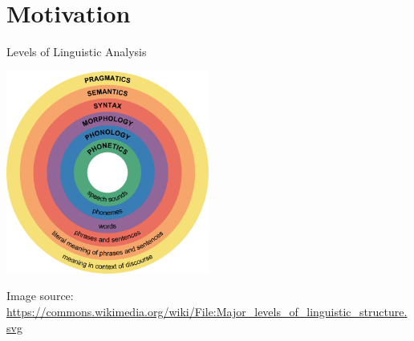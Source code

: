 

%
%


%
%  


\section{Motivation}





\begin{frame}{Levels of Linguistic Analysis}
	\vspace{-15pt}
	
  \begin{center}
  	\includegraphics[width=0.5\textwidth]{figures/levels}
  \end{center}
   
{  \tiny
  Image source: \url{https://commons.wikimedia.org/wiki/File:Major_levels_of_linguistic_structure.svg}
 } 

\end{frame}



